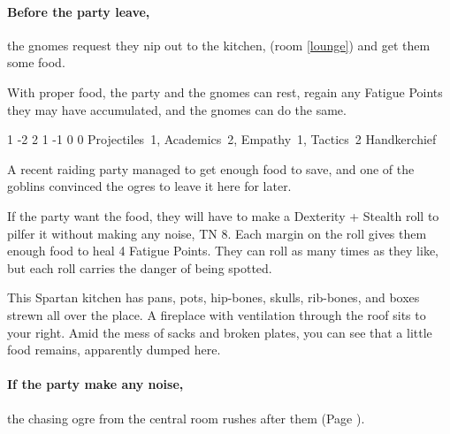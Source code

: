 \begin{multicols}{2}
\paragraph{Before the party leave,}
the gnomes request they nip out to the kitchen, (room \ref{lounge}) and get them some food.

With proper food, the party and the gnomes can rest, regain any Fatigue Points they may have accumulated, and the gnomes can do the same.




{1}%
{-2}%
{{2}%
{1}%
{-1}}%
{0}%
{0}%
{Projectiles~1, Academics~2, Empathy~1, Tactics~2}%
{Handkerchief}%
{
  \setcounter{Fire}{2}
  \setcounter{Air}{2}
}


A recent raiding party managed to get enough food to save, and one of the goblins convinced the ogres to leave it here for later.

If the party want the food, they will have to make a Dexterity + Stealth roll to pilfer it without making any noise, TN 8.
Each margin on the roll gives them enough food to heal 4 Fatigue Points.
They can roll as many times as they like, but each roll carries the danger of being spotted.

\begin{boxtext}

  This Spartan kitchen has pans, pots, hip-bones, skulls, rib-bones, and boxes strewn all over the place.
  A fireplace with ventilation through the roof sits to your right.
  Amid the mess of sacks and broken plates, you can see that a little food remains, apparently dumped here.

\end{boxtext}

\paragraph{If the party make any noise,}
the chasing ogre from the central room rushes after them (Page \pageref{chasingogre}).

\begin{figure*}[b!]


\end{figure*}
\end{multicols}
